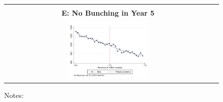 \begin{figure}[t]
\begin{centering}
\begin{tabular}{cc}
\vspace{0.2cm}
  & \tabularnewline
\textbf{E: No Bunching in Year 5}  & \tabularnewline
\includegraphics[width=0.4\textwidth]{graphs/BunchingYear3_1Million_Degree4_30000}  & \tabularnewline
\end{tabular}
\par\end{centering}
{\footnotesize{}{}{}Notes: }{\footnotesize \par}
\end{figure}

\newpage{}

